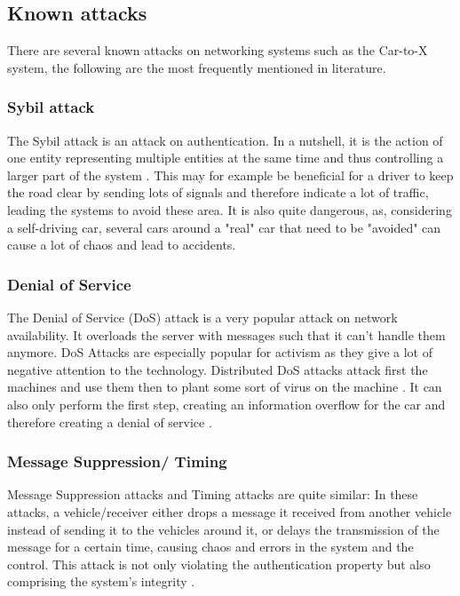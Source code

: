 \subsection{Known attacks}
There are several known attacks on networking systems such as the Car-to-X system, the following are the most frequently mentioned in literature.\cite{svn}\cite{adhocNetworking}
\subsubsection{Sybil attack}
The Sybil attack is an attack on authentication.
In a nutshell, it is the action of one entity representing multiple entities at the same time and thus controlling a larger part of the system \cite{sybil}. This may for example be beneficial for a driver to keep the road clear by sending lots of signals and therefore indicate a lot of traffic, leading the systems to avoid these area. It is also quite dangerous, as, considering a self-driving car, several cars around a "real" car that need to be "avoided" can cause a lot of chaos and lead to accidents.
\subsubsection{Denial of Service}
The Denial of Service (DoS) attack is a very popular attack on network availability. It overloads the server with messages such that it can't handle them anymore. DoS Attacks are especially popular for activism as they give a lot of negative attention to the technology. \cite{SiC}
Distributed DoS attacks attack first the machines and use them then to plant some sort of virus on the machine \cite{SiC}. It can also only perform the first step, creating an information overflow for the car and therefore creating a denial of service \cite{adhocNetworking}.

\subsubsection{Message Suppression/ Timing}
Message Suppression attacks and Timing attacks are quite similar: In these attacks, a vehicle/receiver either drops a message it received from another vehicle instead of sending it to the vehicles around it, or delays the transmission of the message for a certain time, causing chaos and errors in the system and the control.
This attack is not only violating the authentication property but also comprising the system's integrity \cite{svn}\cite{adhocNetworking}.

